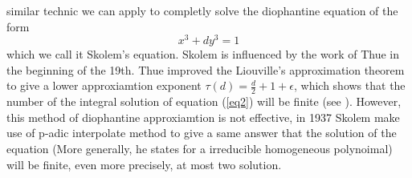     similar technic we can apply to completly solve the diophantine equation of the form
    \begin{equation} \label{eq2}
        x^3+dy^3=1
    \end{equation}
    which we call it Skolem's equation. Skolem is influenced by the work of Thue in the beginning of the 19th. Thue improved the Liouville's approximation theorem to give a lower approxiamtion exponent \(\tau(d) = \frac{d}{2}+1+\epsilon\), which shows that the number of the integral solution of equation (\ref{eq2}) will be finite (see \cite[Chapter 11]{silverman2009arithmetic}). However, this method of diophantine approxiamtion is not effective, in 1937 Skolem make use of p-adic interpolate method to give a same answer that the solution of the equation (More generally, he states for a irreducible homogeneous polynoimal) will be finite, even more precisely, at most two solution.

